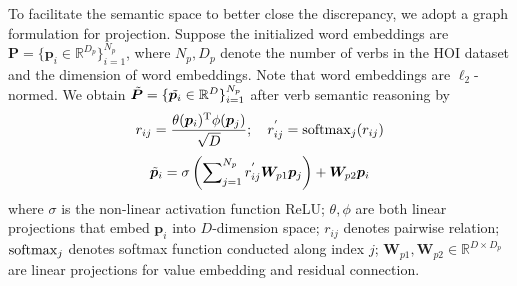 \documentclass[letterpaper]{article} %
\begin{document}
To facilitate the semantic space to better close the discrepancy, we adopt a graph formulation for projection. Suppose the initialized word embeddings are $\bm{P} = \{\bm{p}_i \in \mathbb{R}^{D_p} \}_{i=1}^{N_p}$, where $N_p, D_p$ denote the number of verbs in the HOI dataset and the dimension of word embeddings. Note that word embeddings are $\ell_2$-normed. We obtain $\Tilde{\bm{P}} = \{\Tilde{\bm{p}_i} \in \mathbb{R}^{D} \}_{i=1}^{N_p}$ after verb semantic reasoning by 
\begin{equation}
    r_{ij} = \frac{\theta(\bm{p}_i)^{\rm T} \phi(\bm{p}_j)}{\sqrt{D}}; \quad r_{ij}^{'} = {\rm softmax}_{j}(r_{ij})
\end{equation}
\begin{equation}
    \Tilde{\bm{p}}_i = \sigma\left(\sum\nolimits_{j=1}^{N_p}{r_{ij}^{'} \bm{W}_{p1} \bm{p}_j}\right) + \bm{W}_{p2} \bm{p}_i
\end{equation}
where $\sigma$ is the non-linear activation function ReLU; $\theta,\phi$ are both linear projections that embed $\bm{p}_i$ into $D$-dimension space; $r_{ij}$ denotes pairwise relation; ${\rm softmax}_j$ denotes softmax function conducted along index $j$; $\bm{W}_{p1},\bm{W}_{p2} \in \mathbb{R}^{D \times D_p}$ are linear projections for value embedding and residual connection.
\end{document}
